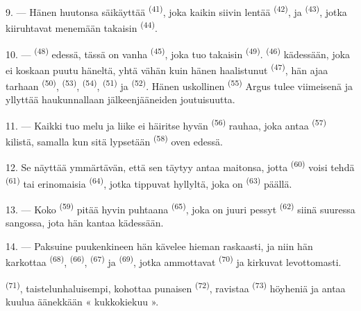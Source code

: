 9. --- Hänen huutonsa säikäyttää  \textsuperscript{(41)}, joka
kaikin siivin lentää  \textsuperscript{(42)}, ja
 \textsuperscript{(43)}, jotka kiiruhtavat menemään takaisin
 \textsuperscript{(44)}.

10. ---  \textsuperscript{(48)} edessä, tässä on vanha
 \textsuperscript{(45)}, joka tuo takaisin 
\textsuperscript{(49)}.  \textsuperscript{(46)} kädessään,
joka ei koskaan puutu häneltä, yhtä vähän kuin hänen haalistunut
 \textsuperscript{(47)}, hän ajaa tarhaan 
\textsuperscript{(50)},  \textsuperscript{(53)}, 
\textsuperscript{(54)},  \textsuperscript{(51)} ja
 \textsuperscript{(52)}. Hänen uskollinen 
\textsuperscript{(55)} Argus tulee viimeisenä ja yllyttää haukunnallaan
jälkeenjääneiden joutuisuutta.

11. --- Kaikki tuo melu ja liike ei häiritse hyvän 
\textsuperscript{(56)} rauhaa, joka antaa 
\textsuperscript{(57)} kilistä, samalla kun sitä lypsetään 
\textsuperscript{(58)} oven edessä.

12. Se näyttää ymmärtävän, että sen täytyy antaa maitonsa, jotta
 \textsuperscript{(60)} voisi tehdä 
 \textsuperscript{(61)} tai erinomaisia 
\textsuperscript{(64)}, jotka tippuvat hyllyltä, joka on 
\textsuperscript{(63)} päällä.

13. --- Koko  \textsuperscript{(59)} pitää hyvin puhtaana
 \textsuperscript{(65)}, joka on juuri pessyt
 \textsuperscript{(62)} siinä suuressa sangossa, jota hän
kantaa kädessään.

\VUsaut{3.0mm}
\VUsaut{3.0mm}

14. --- Paksuine puukenkineen hän kävelee hieman raskaasti, ja niin hän
karkottaa  \textsuperscript{(68)}, 
\textsuperscript{(66)},  \textsuperscript{(67)} ja
 \textsuperscript{(69)}, jotka ammottavat 
\textsuperscript{(70)} ja kirkuvat levottomasti.

 \textsuperscript{(71)}, taistelunhaluisempi, kohottaa punaisen
 \textsuperscript{(72)}, ravistaa 
\textsuperscript{(73)} höyheniä ja antaa kuulua äänekkään « kukkokiekuu ».

